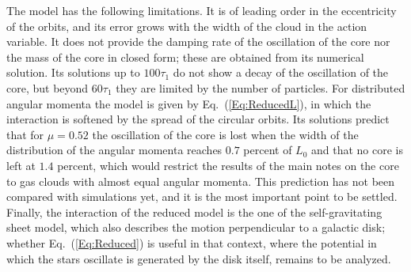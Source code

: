 \documentclass[prd,aps,nofootinbib,superscriptaddress,amsmath,amssymb]{revtex4}
\begin{document}
The model has the following limitations. It is of leading order in the eccentricity of the orbits, and its error grows with the width of the cloud in the action variable. It does not provide the damping rate of the oscillation of the core nor the mass of the core in closed form; these are obtained from its numerical solution. Its solutions up to $100\tau_1$ do not show a decay of the oscillation of the core, but beyond $60\tau_1$ they are limited by the number of particles. For distributed angular momenta the model is given by Eq.~(\ref{Eq:ReducedL}), in which the interaction is softened by the spread of the circular orbits. Its solutions predict that for $\mu = 0.52$ the oscillation of the core is lost when the width of the distribution of the angular momenta reaches $0.7$ percent of $L_0$ and that no core is left at $1.4$ percent, which would restrict the results of the main notes on the core to gas clouds with almost equal angular momenta. This prediction has not been compared with simulations yet, and it is the most important point to be settled. Finally, the interaction of the reduced model is the one of the self-gravitating sheet model, which also describes the motion perpendicular to a galactic disk; whether Eq.~(\ref{Eq:Reduced}) is useful in that context, where the potential in which the stars oscillate is generated by the disk itself, remains to be analyzed.




\end{document}
